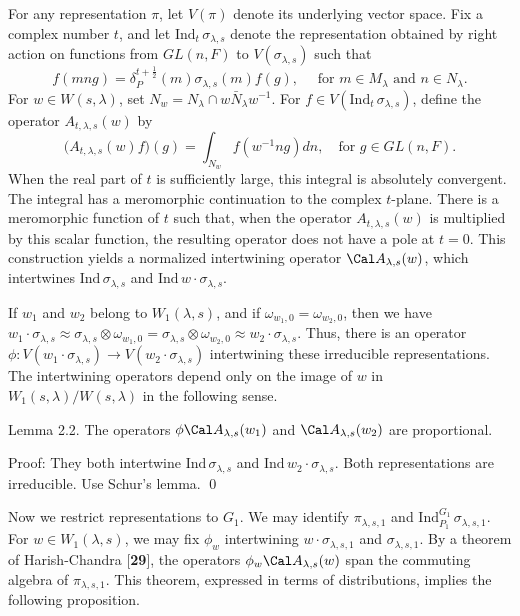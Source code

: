 For any representation
  $ \pi $,
let
  $ V(\pi)$
denote its underlying vector space.
Fix a complex number $t$, and let
  $ \text{Ind}_t \, \sigma_{\lambda,s} $
denote the representation obtained by right action on
functions from
  $ GL(n,F) $
to 
  $ V(\sigma_{\lambda,s}) $
such that%
$$
  f(mng) =
  \delta_P^{t+\frac12} (m)
  \sigma_{\lambda,s} (m) f(g),
  \quad\text { for }
  m \in M_{\lambda} \text{ and }n \in N_{\lambda}.
$$
%
For 
  $ w \in W(s,\lambda) $,
set
  $ N_w = N_\lambda \cap w \bar N_\lambda w^{-1} $.
For 
  $ f \in  V
    (\text{Ind}_t \, \sigma_{\lambda,s}) $,
define the operator
  $ A_{t,\lambda,s} (w) $
by
%
$$
  \bigl(
    A_{t,\lambda,s} (w) f
  \bigr)
  (g) =
  \int_{N_w}
  f (w^{-1} ng) dn, 
  \quad 
  \text{for }g \in GL(n,F).
$$
%
When the real part of $t$ is sufficiently large,
this integral is absolutely convergent.  The integral has a meromorphic
continuation to the complex $t$-plane.
There is a meromorphic function of $t$ such that, when
  the operator $ A_{t,\lambda,s} (w) $
is multiplied by this scalar function, the resulting operator does not have
a pole at
  $ t = 0 $. 
This construction yields a normalized intertwining operator
  $ {\Cal A}_{\lambda,s} (w) $,
which intertwines
  $ \text{Ind} \, \sigma_{\lambda,s} $
and
  $ \text{Ind} \, w \cdot \sigma_{\lambda, s}  $.

If 
  $ w_1 $ and 
  $ w_2$ belong to $W_1 (\lambda,s) $,
and if
  $ \omega_{w_1,0} =
    \omega_{w_2,0} $,
then we have
  $ w_1 \cdot 
    \sigma_{\lambda,s} \approx
    \sigma_{\lambda,s} \otimes
    \omega_{w_1,0} =
    \sigma_{\lambda,s} \otimes
    \omega_{w_2,0} \approx
    w_2 \cdot 
    \sigma_{\lambda,s} $.
Thus, there is an operator 
  $ \phi : 
    V
    (w_1 \cdot \sigma_{\lambda,s})
    \to
    V(w_2 \cdot \sigma_{\lambda,s}) $
intertwining these irreducible representations.
The intertwining operators depend only on the image of $w$
in 
  $ W_1(s,\lambda) /
    W (s,\lambda) $
in the following sense.

\proclaim Lemma {2.2}.
The operators
  $ \phi {\Cal A}_{\lambda,s} (w_1) $
and
  $ {\Cal A}_{\lambda,s} (w_2) $
are proportional.
\finishproclaim

\pproclaim Proof:
They both intertwine
  $ \text{Ind}\, \sigma_{\lambda,s} $
and
  $ \text{Ind}\, w_2 \cdot \sigma_{\lambda,s} $.
Both representations are irreducible.
Use Schur's lemma.
\qed
\finishpproclaim

Now we restrict representations to
  $ G_1 $.
We may identify
  $ \pi_{\lambda,s,1} $
and
  $ \text{Ind}_{P_1}^{G_1} \,
     \sigma_{\lambda,s,1} $.
For
  $ w \in W_1 (\lambda,s) $,
we may fix
  $ \phi_w $
intertwining
  $ w \cdot \sigma_{\lambda,s,1} $
and
  $ \sigma_{\lambda,s,1} $.
By a theorem of Harish-Chandra [{\bf 29}],
the operators
  $ \phi_w {\Cal A}_{\lambda,s} (w) $
span the commuting algebra of 
  $ \pi_{\lambda,s,1} $.
This theorem, expressed in terms of distributions,
implies the following proposition.

